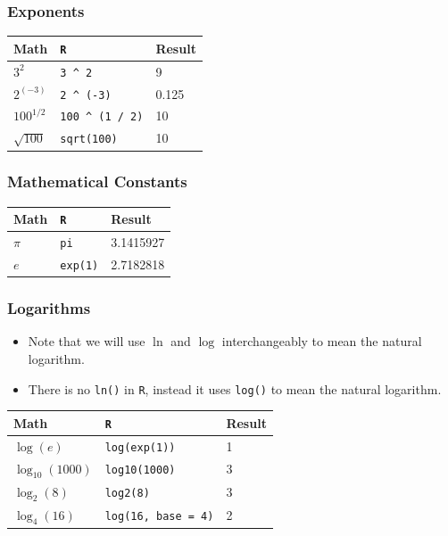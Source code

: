 \documentclass[]{book}
\providecommand{\tightlist}{%
  \setlength{\itemsep}{0pt}\setlength{\parskip}{0pt}}
\begin{document}
\subsubsection*{Exponents}\label{exponents}

\begin{longtable}[]{@{}lll@{}}
\toprule
Math & \texttt{R} & Result\tabularnewline
\midrule
\endhead
\(3^2\) & \texttt{3\ \^{}\ 2} & 9\tabularnewline
\(2^{(-3)}\) & \texttt{2\ \^{}\ (-3)} & 0.125\tabularnewline
\(100^{1/2}\) & \texttt{100\ \^{}\ (1\ /\ 2)} & 10\tabularnewline
\(\sqrt{100}\) & \texttt{sqrt(100)} & 10\tabularnewline
\bottomrule
\end{longtable}

\subsubsection*{Mathematical Constants}\label{mathematical-constants}

\begin{longtable}[]{@{}lll@{}}
\toprule
Math & \texttt{R} & Result\tabularnewline
\midrule
\endhead
\(\pi\) & \texttt{pi} & 3.1415927\tabularnewline
\(e\) & \texttt{exp(1)} & 2.7182818\tabularnewline
\bottomrule
\end{longtable}

\subsubsection*{Logarithms}\label{logarithms}

\begin{itemize}
\tightlist
\item
  Note that we will use \(\ln\) and \(\log\) interchangeably to mean the
  natural logarithm.
\item
  There is no \texttt{ln()} in \texttt{R}, instead it uses
  \texttt{log()} to mean the natural logarithm.
\end{itemize}

\begin{longtable}[]{@{}lll@{}}
\toprule
Math & \texttt{R} & Result\tabularnewline
\midrule
\endhead
\(\log(e)\) & \texttt{log(exp(1))} & 1\tabularnewline
\(\log_{10}(1000)\) & \texttt{log10(1000)} & 3\tabularnewline
\(\log_{2}(8)\) & \texttt{log2(8)} & 3\tabularnewline
\(\log_{4}(16)\) & \texttt{log(16,\ base\ =\ 4)} & 2\tabularnewline
\bottomrule
\end{longtable}
\end{document}

